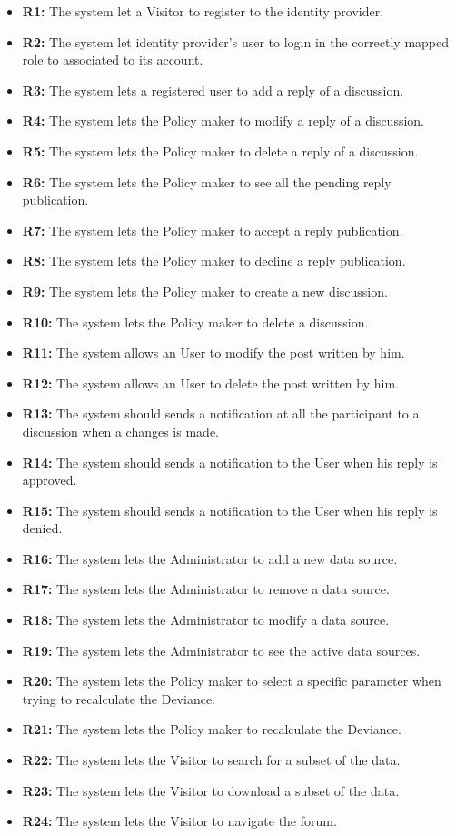 \begin{itemize}
\item \textbf{R1:} The system let a Visitor to register to the identity provider.
\item \textbf{R2:} The system let identity provider's user to login in the correctly mapped role to associated to its account.
\item \textbf{R3:} The system lets a registered user to add a reply of a discussion.
\item \textbf{R4:} The system lets the Policy maker to modify a reply of a discussion.
\item \textbf{R5:} The system lets the Policy maker to delete a reply of a discussion.
\item \textbf{R6:} The system lets the Policy maker to see all the pending reply publication.
\item \textbf{R7:} The system lets the Policy maker to accept a reply publication.
\item \textbf{R8:} The system lets the Policy maker to decline a reply publication.
\item \textbf{R9:} The system lets the Policy maker to create a new discussion.
\item \textbf{R10:} The system lets the Policy maker to delete a discussion.
\item \textbf{R11:} The system allows an User to modify the post written by him.
\item \textbf{R12:} The system allows an User to delete the post written by him.
\item \textbf{R13:} The system should sends a notification at all the participant to a discussion when a changes is made.
\item \textbf{R14:} The system should sends a notification to the User when his reply is approved.
\item \textbf{R15:} The system should sends a notification to the User when his reply is denied.
\item \textbf{R16:} The system lets the Administrator to add a new data source.
\item \textbf{R17:} The system lets the Administrator to remove a data source.
\item \textbf{R18:} The system lets the Administrator to modify a data source.
\item \textbf{R19:} The system lets the Administrator to see the active data sources.
\item \textbf{R20:} The system lets the Policy maker to select a specific parameter when trying to recalculate the Deviance.
\item \textbf{R21:} The system lets the Policy maker to recalculate the Deviance.
\item \textbf{R22:} The system lets the Visitor to search for a subset of the data.
\item \textbf{R23:} The system lets the Visitor to download a subset of the data.
\item \textbf{R24:} The system lets the Visitor to navigate the forum.
\end{itemize}



